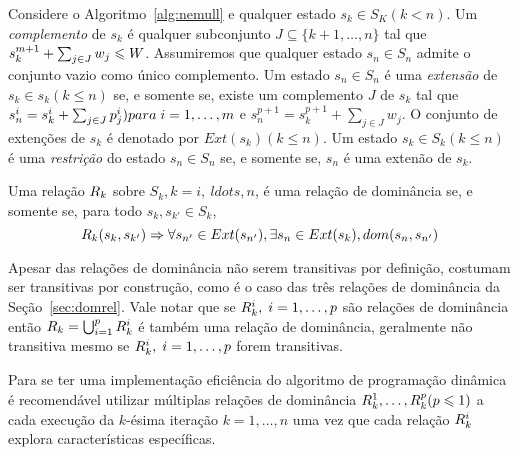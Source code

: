 

\begin{mydef}
Considere o Algoritmo~\ref{alg:nemull} e qualquer estado $s_k \in S_K (k < n)$.
Um \emph{complemento} de $s_k$ é qualquer subconjunto  $J \subseteq \{k+1, \ldots, n\}$
tal que $s_k^{m+1} + \sum_{j \in J} w_j \leqslant W$.
Assumiremos que qualquer estado $s_n \in S_n$ admite o conjunto vazio como único complemento.
Um estado $s_n \in S_n$ é uma \emph{extensão} de $s_k \in s_k (k \leq n )$ se, e somente se,
existe um complemento $J$ de $s_k$ tal que $s_n^i = s_k^i + \sum_{j \in J} p_j^i) para \; i = 1, \ldots, m$
e $s_n^{p+1} = s_k^{p+1} + \sum_{j \in J} w_j$.
O conjunto de extenções de $s_k$ é denotado por $Ext(s_k) (k \leq n)$.
Um estado $s_k \in S_k (k \leq n)$ é uma \emph{restrição} do estado $s_n \in S_n$
se, e somente se, $s_n$ é uma extenão de $s_k$.
\end{mydef}


\begin{mydef}
Uma relação $R_k$ sobre $S_k, k = i,\ ldots, n$, é uma relação de dominância
se, e somente se, para todo $s_k, s_{k'} \in S_k$,
\begin{equation}
  R_k(s_k, s_{{k'}}) \Rightarrow \forall s_{{n'}} \in Ext(s_{{n'}}),
    \exists s_n \in Ext(s_k), dom(s_n, s_{{n'}})
\end{equation}
\end{mydef}

Apesar das relações de dominância não serem transitivas por definição,
costumam ser transitivas por construção, como é o caso
das três relações de dominância da Seção~\ref{sec:domrel}.
Vale notar que se $R_k^i, \; i = 1, \ldots, p$ são relações de dominância
então $R_k = \bigcup^{p}_{i = 1} R_k^i$ é também uma relação
de dominância, geralmente não transitiva mesmo se $R_k^i, \; i = 1, \ldots, p$
forem transitivas.

Para se ter uma implementação eficiência do algoritmo de programação dinâmica
é recomendável utilizar múltiplas relações de dominância
$R_k^1, \ldots, R_k^p (p \leqslant 1)$ a cada execução da $k$-ésima iteração
$k = 1, \ldots, n$ uma vez que cada relação $R_k^i$ explora características
específicas.

